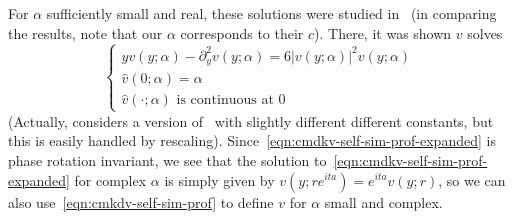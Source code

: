 \documentclass[letterpaper, reqno,final]{amsart}
\begin{document}
For $\alpha$ sufficiently small and real, these solutions were studied in~\cite{correiaAsymptoticsFourierSpace2020} (in comparing the results, note that our $\alpha$ corresponds to their $c$).  There, it was shown $v$ solves
\begin{equation}\label{eqn:cmkdv-self-sim-prof}
    \left\{\begin{array}{c}
        yv(y;\alpha) -  \partial_y^2 v(y;\alpha) = 6 |v(y;\alpha)|^2v(y;\alpha)\\
        \hat{v}(0;\alpha) = \alpha\\
        \hat{v}(\cdot;\alpha) \text{ is continuous at } 0
    \end{array}\right.
\end{equation}
(Actually, \cite{correiaAsymptoticsFourierSpace2020} considers a version of~ with slightly different different constants, but this is easily handled by rescaling).  Since~\eqref{eqn:cmdkv-self-sim-prof-expanded} is phase rotation invariant, we see that the solution to~\eqref{eqn:cmdkv-self-sim-prof-expanded} for complex $\alpha$ is simply given by $v(y;r e^{ita}) =e^{ita} v(y;r)$, so we can also use~\eqref{eqn:cmkdv-self-sim-prof} to define $v$ for $\alpha$ small and complex.  
\end{document}
